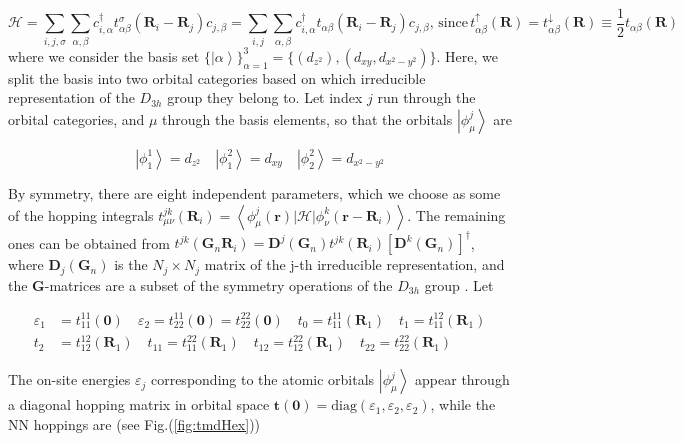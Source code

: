 \begin{equation}
\mathcal{H} = \sum_{i, j, \sigma} \sum_{\alpha, \beta} c_{i,\alpha}^\dagger t_{\alpha \beta}^\sigma ( \bm R_i - \bm R_j ) c_{j, \beta} = \sum_{i, j} \sum_{\alpha, \beta} c_{i,\alpha}^\dagger t_{\alpha \beta} ( \bm R_i - \bm R_j ) c_{j, \beta} , \, \text{since} \,  t_{\alpha \beta}^\uparrow ( \bm R )  = t_{\alpha \beta}^\downarrow ( \bm R ) \equiv \frac{1}{2} t_{\alpha \beta} ( \bm R )
\end{equation}
where we consider the basis set $\{ \left| \alpha \right\rangle \}_{\alpha = 1}^3 = \{ (d_{z^2}) , (d_{x y}, d_{ x^2 - y^2 }) \} $.
Here, we split the basis into two orbital categories based on which irreducible representation of the $D_{3h}$ group they belong to.
Let index $j$ run through the orbital categories, and $\mu$ through the basis elements, so that the orbitals $\left| \phi_\mu^j \right\rangle$ are

\begin{equation}
\left| \phi_1^1 \right\rangle = d_{z^2} \quad \left| \phi_1^2 \right\rangle = d_{xy} \quad \left| \phi_2^2 \right\rangle = d_{x^2 - y^2} 
\end{equation}

By symmetry, there are eight independent parameters, which we choose as some of the hopping integrals $t_{\mu \nu}^{j k} ( \bm R_i ) = \left\langle \phi_\mu^j ( \bm r ) | \mathcal{H} | \phi_{\nu}^k ( \bm r - \bm R_i ) \right\rangle$.
The remaining ones can be obtained from $t^{jk} ( \bm G_n \bm R_i ) = \bm D^j ( \bm G_n ) t^{j k} ( \bm R_i ) [ \bm D^k ( \bm G_n ) ]^\dagger$, where $\bm D_j ( \bm G_n )$ is the $N_j \times N_j$ matrix of the j-th irreducible representation, and the $\bm G$-matrices are a subset of the symmetry operations of the $D_{3h}$ group \cite{braz_electronic_2015,liu_three-band_2013}.
Let 

\begin{equation}
\begin{split}
\varepsilon_1 &= t_{11}^{11} ( \bm 0 ) \quad \varepsilon_2 = t_{22}^{11} ( \bm 0 ) = t_{22}^{22} ( \bm 0 ) \quad t_0 = t_{11}^{11} ( \bm R_1 ) \quad t_1 = t_{11}^{12} ( \bm R_1 ) \\
t_2 &= t_{12}^{12} ( \bm R_1 ) \quad t_{11} = t_{11}^{22} ( \bm R_1 ) \quad t_{12} = t_{12}^{22} ( \bm R_1 ) \quad t_{22} = t_{22}^{22} ( \bm R_1 )
\end{split}
\end{equation}

The on-site energies $\varepsilon_j$ corresponding to the atomic orbitals $\left| \phi_\mu^j \right\rangle$ appear through a diagonal hopping matrix in orbital space $\bm t ( \bm 0 ) = \text{diag} ( \varepsilon_1, \varepsilon_2, \varepsilon_2 )$, while the NN hoppings are (see Fig.(\ref{fig:tmdHex}))


